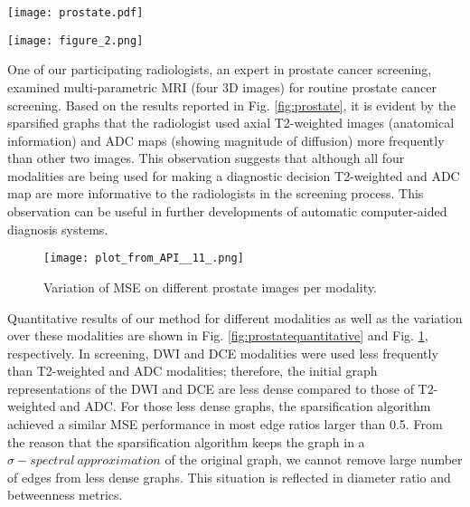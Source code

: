 \documentclass[preprint,12pt]{elsarticle}
\begin{document}
\begin{figure*}
\centering
\texttt{[image: prostate.pdf]}
\caption{Prostate cancer screening experiments with multi-parametric MRI. Left: four MRI modalities and corresponding dense gaze patterns. Right: Clustered and sparsified gaze patterns corresponding to each modality. First column: clustered dense gaze patterns. Second column: attention based clustering. Third column: sparse graph after further reducing edges. \label{fig:prostate}}
\texttt{[image: figure\_2.png]}
\caption{Prostate screening experiment quantitative results.\label{fig:prostatequantitative}}
\end{figure*}

One of our participating radiologists, an expert in prostate cancer screening, examined multi-parametric MRI (four 3D images) for routine prostate cancer screening. Based on the results reported in Fig. \ref{fig:prostate}, it is evident by the sparsified graphs that the radiologist used axial T2-weighted images (anatomical information) and ADC maps (showing magnitude of diffusion) more frequently than other two images. This observation suggests that although all four modalities are being used for making a diagnostic decision T2-weighted and ADC map are more informative to the radiologists in the screening process. This observation can be useful in further developments of automatic computer-aided diagnosis systems.



\begin{figure}[h]
\centering
\texttt{[image: plot\_from\_API\_\_11\_.png]}
\caption{Variation of MSE on different prostate images per modality.  \label{fig:prostatevariation}}
\end{figure}

Quantitative results of our method for different modalities as well as the variation over these modalities are shown in Fig. \ref{fig:prostatequantitative} and Fig. \ref{fig:prostatevariation}, respectively. In screening, DWI and DCE modalities were used less frequently than T2-weighted and ADC modalities; therefore, the initial graph representations of the DWI and DCE are less dense compared to those of T2-weighted and ADC. For those less dense graphs, the sparsification algorithm  achieved a similar MSE performance in most edge ratios larger than 0.5. From the reason that  the sparsification algorithm keeps the graph in a $\sigma-spectral~approximation$ of the original graph, we cannot remove large number of edges from less dense graphs. This situation is reflected in diameter ratio and betweenness metrics. %
\end{document}
